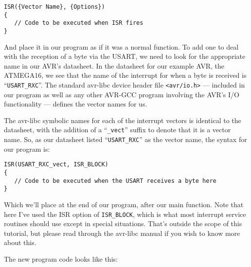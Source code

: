 \documentclass[a4paper,oneside,notitlepage]{book}
\begin{document}
\begin{center}
\begin{lstlisting}
ISR({Vector Name}, {Options})
{
   // Code to be executed when ISR fires
}
\end{lstlisting}
\end{center}

And place it in our program as if it was a normal function. To add one to deal with the reception of a byte via the USART, we need to look for the appropriate name in our AVR's datasheet. In the datasheet for our example AVR, the ATMEGA16, we see that the name of the interrupt for when a byte is received is ``\texttt{USART\_RXC}''. The standard avr-libc device header file \texttt{<avr/io.h>} --- included in our program as well as any other AVR-GCC program involving the AVR's I/O functionality --- defines the vector names for us.

The avr-libc symbolic names for each of the interrupt vectors is identical to the datasheet, with the addition of a ``\texttt{\_vect}'' suffix to denote that it is a vector name. So, as our datasheet listed ``\texttt{USART\_RXC}'' as the vector name, the syntax for our program is:

\begin{center}
\begin{lstlisting}
ISR(USART_RXC_vect, ISR_BLOCK)
{
   // Code to be executed when the USART receives a byte here
}
\end{lstlisting}
\end{center}

Which we'll place at the end of our program, after our main function. Note that here I've used the ISR option of \texttt{ISR\_BLOCK}, which is what most interrupt service routines should use except in special situations. That's outside the scope of this tutorial, but please read through the avr-libc manual if you wish to know more about this.

The new program code looks like this:
\end{document}
